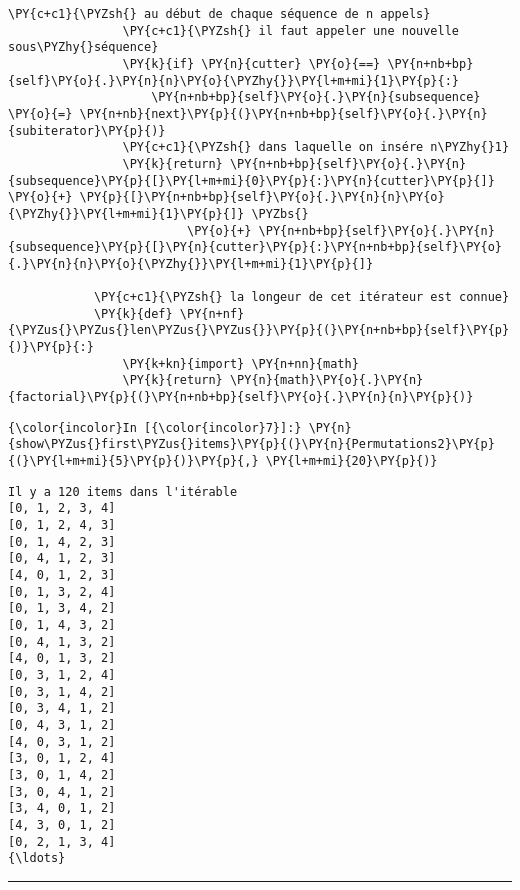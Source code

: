\begin{Verbatim}[commandchars=\\\{\},frame=single,framerule=0.3mm,rulecolor=\color{cellframecolor}]
                \PY{c+c1}{\PYZsh{} au début de chaque séquence de n appels}
                \PY{c+c1}{\PYZsh{} il faut appeler une nouvelle sous\PYZhy{}séquence}
                \PY{k}{if} \PY{n}{cutter} \PY{o}{==} \PY{n+nb+bp}{self}\PY{o}{.}\PY{n}{n}\PY{o}{\PYZhy{}}\PY{l+m+mi}{1}\PY{p}{:}
                    \PY{n+nb+bp}{self}\PY{o}{.}\PY{n}{subsequence} \PY{o}{=} \PY{n+nb}{next}\PY{p}{(}\PY{n+nb+bp}{self}\PY{o}{.}\PY{n}{subiterator}\PY{p}{)}
                \PY{c+c1}{\PYZsh{} dans laquelle on insére n\PYZhy{}1}
                \PY{k}{return} \PY{n+nb+bp}{self}\PY{o}{.}\PY{n}{subsequence}\PY{p}{[}\PY{l+m+mi}{0}\PY{p}{:}\PY{n}{cutter}\PY{p}{]} \PY{o}{+} \PY{p}{[}\PY{n+nb+bp}{self}\PY{o}{.}\PY{n}{n}\PY{o}{\PYZhy{}}\PY{l+m+mi}{1}\PY{p}{]} \PYZbs{}
                         \PY{o}{+} \PY{n+nb+bp}{self}\PY{o}{.}\PY{n}{subsequence}\PY{p}{[}\PY{n}{cutter}\PY{p}{:}\PY{n+nb+bp}{self}\PY{o}{.}\PY{n}{n}\PY{o}{\PYZhy{}}\PY{l+m+mi}{1}\PY{p}{]}
        
            \PY{c+c1}{\PYZsh{} la longeur de cet itérateur est connue}
            \PY{k}{def} \PY{n+nf}{\PYZus{}\PYZus{}len\PYZus{}\PYZus{}}\PY{p}{(}\PY{n+nb+bp}{self}\PY{p}{)}\PY{p}{:}
                \PY{k+kn}{import} \PY{n+nn}{math}
                \PY{k}{return} \PY{n}{math}\PY{o}{.}\PY{n}{factorial}\PY{p}{(}\PY{n+nb+bp}{self}\PY{o}{.}\PY{n}{n}\PY{p}{)}
\end{Verbatim}


    \begin{Verbatim}[commandchars=\\\{\},frame=single,framerule=0.3mm,rulecolor=\color{cellframecolor}]
{\color{incolor}In [{\color{incolor}7}]:} \PY{n}{show\PYZus{}first\PYZus{}items}\PY{p}{(}\PY{n}{Permutations2}\PY{p}{(}\PY{l+m+mi}{5}\PY{p}{)}\PY{p}{,} \PY{l+m+mi}{20}\PY{p}{)}
\end{Verbatim}


    \begin{Verbatim}[commandchars=\\\{\},frame=single,framerule=0.3mm,rulecolor=\color{cellframecolor}]
Il y a 120 items dans l'itérable
[0, 1, 2, 3, 4]
[0, 1, 2, 4, 3]
[0, 1, 4, 2, 3]
[0, 4, 1, 2, 3]
[4, 0, 1, 2, 3]
[0, 1, 3, 2, 4]
[0, 1, 3, 4, 2]
[0, 1, 4, 3, 2]
[0, 4, 1, 3, 2]
[4, 0, 1, 3, 2]
[0, 3, 1, 2, 4]
[0, 3, 1, 4, 2]
[0, 3, 4, 1, 2]
[0, 4, 3, 1, 2]
[4, 0, 3, 1, 2]
[3, 0, 1, 2, 4]
[3, 0, 1, 4, 2]
[3, 0, 4, 1, 2]
[3, 4, 0, 1, 2]
[4, 3, 0, 1, 2]
[0, 2, 1, 3, 4]
{\ldots}
\end{Verbatim}

    \begin{center}\rule{0.5\linewidth}{\linethickness}\end{center}

